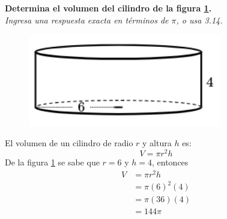 \textbf{Determina el volumen del cilindro de la figura \ref{fig:vol_cil_05}.}\\
\textit{Ingresa una respuesta exacta en términos de $\pi$, o usa 3.14.}\\

\begin{minipage}[t]{0.3\linewidth}
    \begin{figure}[H]
        \centering
            \includegraphics[width=0.75\textwidth]{../images/vol_cil_05.png}
        \caption{}
        \label{fig:vol_cil_05}
    \end{figure}
\end{minipage}%
\begin{minipage}[t]{0.7\linewidth}
    \begin{solutionbox}{5cm}        El volumen de un cilindro de radio $r$ y altura $h$ es:
        \begin{equation*}
            V = \pi r^2 h
        \end{equation*}
        De la figura \ref{fig:vol_cil_05} se sabe que $r=6$ y $h=4$, entonces
        \begin{equation*}
            \begin{split}
                V & = \pi r^2 h\\
                & = \pi (6)^2 (4)\\
                & = \pi (36) (4)\\
                & = 144\pi
            \end{split}
        \end{equation*}
    \end{solutionbox}
\end{minipage}%